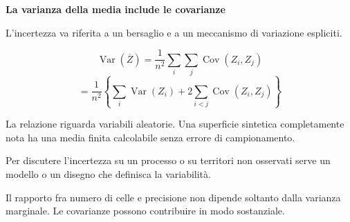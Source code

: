 \documentclass[12pt,aspectratio=1610]{beamer}
\newcommand{\PBody}[1]{\par{\fontsize{11.3}{14.8}\selectfont #1\par}}
\newcommand{\PSmall}[1]{\par{\fontsize{9.8}{13.1}\selectfont #1\par}}
\newcommand{\PInfo}[1]{%
\begin{tcolorbox}[enhanced,arc=1.6mm,boxrule=.55pt,colback=GeoTint,
 colframe=Rule!80!Classical,left=2.3mm,right=2.3mm,top=2mm,bottom=2mm,
 before skip=1mm,after skip=1mm]
\PSmall{#1}\end{tcolorbox}}
\begin{document}
\begin{frame}[plain]\hypertarget{slide97}{}
\begin{lrbox}{\TitleBox}
\begin{minipage}[t]{17.7cm}\raggedright\color{Ink}\fontsize{11.3}{14.8}\selectfont
\color{Navy}\bfseries\fontsize{20.6}{24.5}\selectfont La varianza della media include le covarianze
\end{minipage}\end{lrbox}

\begin{lrbox}{\RecallBox}
\begin{minipage}[t]{14.3cm}\raggedright\color{Ink}\fontsize{11.3}{14.8}\selectfont
\fontsize{10.3}{13.8}\selectfont L’incertezza va riferita a un bersaglio e a un meccanismo di variazione espliciti.
\end{minipage}\end{lrbox}

\begin{lrbox}{\PilotLeftBox}
\begin{minipage}[t]{10.05cm}\raggedright\color{Ink}\fontsize{11.3}{14.8}\selectfont
\[\operatorname{Var}(\overline Z)
 =\frac1{n^2}\sum_i\sum_j\operatorname{Cov}(Z_i,Z_j)\]
\[=\frac1{n^2}\left\{\sum_i\operatorname{Var}(Z_i)
       +2\sum_{i<j}\operatorname{Cov}(Z_i,Z_j)\right\}\]
\PInfo{La relazione riguarda variabili aleatorie. Una superficie sintetica completamente nota ha una media finita calcolabile senza errore di campionamento.}

\end{minipage}\end{lrbox}

\begin{lrbox}{\PilotRightBox}
\begin{minipage}[t]{7.55cm}\raggedright\color{Ink}\fontsize{11.3}{14.8}\selectfont
\PBody{Per discutere l’incertezza su un processo o su territori non osservati serve un modello o un disegno che definisca la variabilità.}
\vspace{2.5mm}
\PBody{Il rapporto fra numero di celle e precisione non dipende soltanto dalla varianza marginale. Le covarianze possono contribuire in modo sostanziale.}
\vspace{2.5mm}


\end{minipage}
\end{lrbox}
\end{frame}
\end{document}
